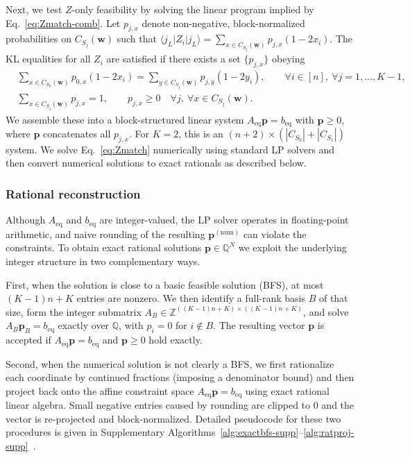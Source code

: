 \documentclass[pdflatex,sn-nature]{sn-jnl}%
\theoremstyle{thmstyleone}%
\theoremstyle{thmstyletwo}%
\theoremstyle{thmstylethree}%
\begin{document}
Next, we test $Z$-only feasibility by solving the linear program implied by Eq.~\eqref{eq:Zmatch-comb}. Let $p_{j,x}$ denote non-negative, block-normalized probabilities on $C_{S_j}(\mathbf w)$ such that
$\langle j_{L} |Z_i| j_{L} \rangle=\sum_{x\in C_{S_j}(\mathbf{w})} p_{j,x}(1-2x_i)$. The KL equalities for all $Z_i$ are satisfied if there exists a set $\{p_{j,x}\}$ obeying
\begin{equation}
  \begin{split}
    &\sum_{x\in C_{S_0}(\mathbf{w})} p_{0,x} (1-2x_i)
      = \sum_{y\in C_{S_j}(\mathbf{w})} p_{j,y} (1-2y_i),
      \qquad \forall i\in[n],\ \forall j=1,\dots,K-1,\\
    &\sum_{x\in C_{S_j}(\mathbf{w})} p_{j,x} = 1,\qquad
      p_{j,x}\ge 0\quad \forall j,\ \forall x\in C_{S_j}(\mathbf{w}).
  \end{split}
  \label{eq:Zmatch}
\end{equation}
We assemble these into a block-structured linear system $A_{\mathrm{eq}} \mathbf{p}=b_{\mathrm{eq}}$ with $\mathbf{p}\ge 0$, where $\mathbf{p}$ concatenates all $p_{j,x}$. For $K=2$, this is an $(n+2)\times(|C_{S_0}|+|C_{S_1}|)$ system. We solve Eq.~\eqref{eq:Zmatch} numerically using standard LP solvers and then convert numerical solutions to exact rationals as described below.

\subsubsection{Rational reconstruction}
\label{subsubsec:rational-main}

Although $A_{\mathrm{eq}}$ and $b_{\mathrm{eq}}$ are integer-valued, the LP solver operates in floating-point arithmetic, and naive rounding of the resulting $\mathbf p^{(\mathrm{num})}$ can violate the constraints. To obtain exact rational solutions $\mathbf p\in\mathbb Q^N$ we exploit the underlying integer structure in two complementary ways.

First, when the solution is close to a basic feasible solution (BFS), at most $(K-1)n+K$ entries are nonzero. We then identify a full-rank basis $B$ of that size, form the integer submatrix $A_B\in\mathbb{Z}^{((K-1)n+K)\times((K-1)n+K)}$, and solve
$A_B \mathbf{p}_B=b_{\mathrm{eq}}$ exactly over $\mathbb Q$, with $p_i=0$ for $i\notin B$. The resulting vector $\mathbf{p}$ is accepted if $A_{\mathrm{eq}}\mathbf{p}=b_{\mathrm{eq}}$ and $\mathbf{p}\ge 0$ hold exactly.

Second, when the numerical solution is not clearly a BFS, we first rationalize each coordinate by continued fractions (imposing a denominator bound) and then project back onto the affine constraint space $A_{\mathrm{eq}}\mathbf p=b_{\mathrm{eq}}$ using exact rational linear algebra. Small negative entries caused by rounding are clipped to $0$ and the vector is re-projected and block-normalized. Detailed pseudocode for these two procedures is given in Supplementary Algorithms~\ref{alg:exactbfs-supp}–\ref{alg:ratproj-supp}~\cite{Bareiss1968Sylvester,Bertsimas1997Introduction,Schrijver1986Theory,Vonzurgathen2003Modern,Lenstra1982Factoring,Ferguson1999Analysis}.
\end{document}
